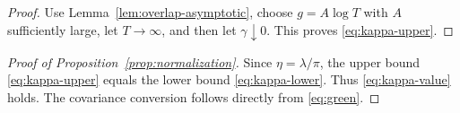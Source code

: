 \begin{proof}
Use Lemma~\ref{lem:overlap-asymptotic}, choose
\(g=A\log T\) with \(A\) sufficiently large, let \(T\to\infty\), and
then let \(\gamma\downarrow0\). This proves
\eqref{eq:kappa-upper}.
\end{proof}

\begin{proof}[Proof of Proposition~\ref{prop:normalization}]
Since \(\eta=\lambda/\pi\), the upper bound
\eqref{eq:kappa-upper} equals the lower bound
\eqref{eq:kappa-lower}. Thus \eqref{eq:kappa-value} holds.
The covariance conversion follows directly from \eqref{eq:green}.
\end{proof}

